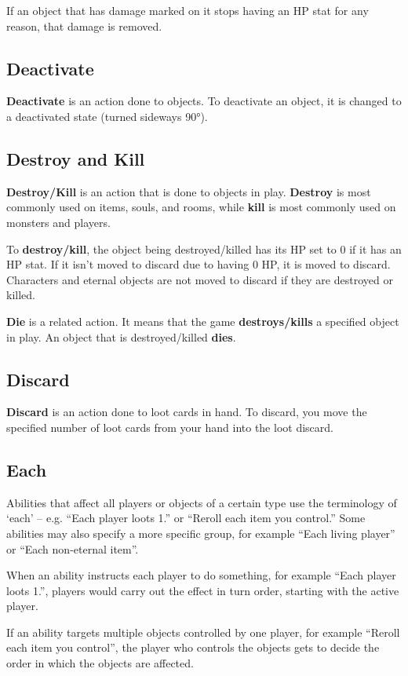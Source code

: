 \documentclass[10pt, a4paper, twoside]{article} %
\begin{document}
    If an object that has damage marked on it stops having an HP stat for any reason, that damage is removed.
    \subsection{Deactivate}
    \textbf{Deactivate} is an action done to objects. To deactivate an object, it is changed to a deactivated state (turned sideways 90°).
    \subsection{Destroy and Kill}
    \label{destroy}
    \textbf{Destroy/Kill} is an action that is done to objects in play. \textbf{Destroy} is most commonly used on items, souls, and rooms, while \textbf{kill} is most commonly used on monsters and players.

    To \textbf{destroy/kill}, the object being destroyed/killed has its HP set to 0 if it has an HP stat. If it isn’t moved to discard due to having 0 HP, it is moved to discard. Characters and eternal objects are not moved to discard if they are destroyed or killed.

    \textbf{Die} is a related action. It means that the game \textbf{destroys/kills} a specified object in play. An object that is destroyed/killed \textbf{dies}.
    \subsection{Discard}
    \textbf{Discard} is an action done to loot cards in hand. To discard, you move the specified number of loot cards from your hand into the loot discard.
    \subsection{Each}
    Abilities that affect all players or objects of a certain type use the terminology of ‘each’ – e.g. “Each player loots 1.” or “Reroll each item you control.” Some abilities may also specify a more specific group, for example “Each living player” or “Each non-eternal item”.

    When an ability instructs each player to do something, for example “Each player loots 1.”, players would carry out the effect in turn order, starting with the active player.

    If an ability targets multiple objects controlled by one player, for example “Reroll each item you control”, the player who controls the objects gets to decide the order in which the objects are affected.
\end{document}
